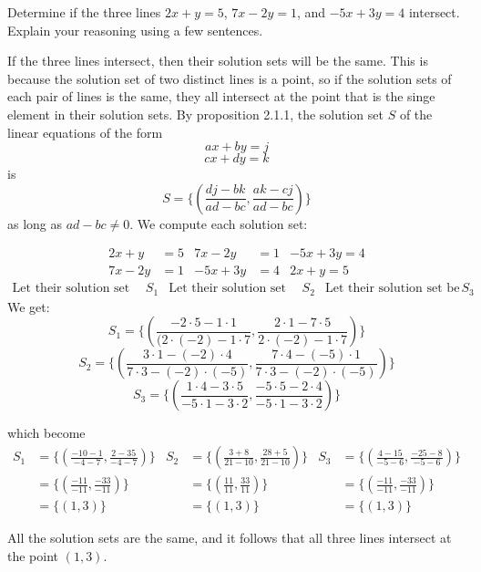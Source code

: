 \documentclass[12pt]{article}
\newenvironment{problem}[2][Problem]
{
	\begin{trivlist} 
		\item[\hskip \labelsep {\bfseries #1 #2:}]
	}
{
	\end{trivlist}
	}
\newenvironment{solution}[1][Solution]
{
	\begin{trivlist} 
		\item[\hskip \labelsep {\itshape #1:}]
	}
	{
	\end{trivlist}
}
\begin{document}
\newpage
\begin{problem}{2}
Determine if the three lines $2x+y=5$, $7x-2y=1$, and $-5x+3y=4$ intersect. Explain your reasoning using a few sentences.
\begin{solution}
If the three lines intersect, then their solution sets will be the same. This is because the solution set of two distinct lines is a point, so if the solution sets of each pair of lines is the same, they all intersect at the point that is the singe element in their solution sets. By proposition 2.1.1, the solution set $S$ of the linear equations of the form
\[
ax + by =j
\]
\[
cx+dy=k
\]
is 
\[
S= \Bigg\{ \left( \frac{dj-bk}{ad-bc}, \frac{ak-cj}{ad-bc} \right) \Bigg\}
\]
as long as $ad-bc \neq 0$. We compute each solution set:

\begin{align*}
2x+y&=5 & 7x-2y&=1 & -5x+3y=4\\
7x-2y&=1& -5x+3y&=4 & 2x+y=5
\end{align*}
\begin{align*}
\text{Let their solution set be } & S_1 & \text{Let their solution set be } & S_2 & \text{Let their solution set be } S_3
\end{align*}
We get:
\[
S_1=\Big\{ \left( \frac{-2 \cdot 5 -1 \cdot 1}{(2 \cdot (-2) - 1 \cdot 7}, \frac{2 \cdot1 - 7 \cdot 5}{2 \cdot (-2) - 1 \cdot 7} \right) \Big\}
\]
\[S_2=\Big\{ \left( \frac{3 \cdot 1- (-2) \cdot 4}{7 \cdot 3 - (-2) \cdot (-5)}, \frac{7 \cdot 4 - (-5) \cdot 1}{7 \cdot 3 - (-2) \cdot (-5)} \right) \Big\}
\]
\[S_3=\Big\{ \left( \frac{1 \cdot 4 - 3 \cdot 5}{-5 \cdot 1 - 3 \cdot 2}, \frac{-5 \cdot 5 - 2 \cdot 4}{-5 \cdot 1 - 3 \cdot 2} \right) \Big\}
\]

which become
\begin{align*}
S_1&=\Big\{ \left( \frac{-10-1}{-4-7}, \frac{2-35}{-4-7} \right) \Big\} &
S_2&=\Big\{ \left( \frac{3+8}{21-10}, \frac{28+5}{21-10} \right) \Big\} &
S_3&=\Big\{ \left( \frac{4-15}{-5-6}, \frac{-25-8}{-5-6} \right) \Big\}\\
&=\Big\{ \left( \frac{-11}{-11}, \frac{-33}{-11} \right) \Big\} &
&=\Big\{ \left( \frac{11}{11}, \frac{33}{11} \right) \Big\} &
&=\Big\{ \left( \frac{-11}{-11}, \frac{-33}{-11} \right) \Big\}\\
&=\Big\{ \left( 1, 3 \right) \Big\} &
&=\Big\{ \left( 1, 3 \right) \Big\} &
&=\Big\{ \left( 1, 3 \right) \Big\}
\end{align*}

All the solution sets are the same, and it follows that all three lines intersect at the point $(1,3)$.

\begin{align*}
\end{align*}
\end{solution}
\end{problem}
\end{document}
